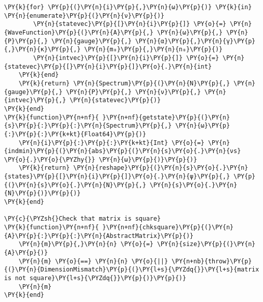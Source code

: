 \begin{Verbatim}[commandchars=\\\{\}]
    \PY{k}{for} \PY{p}{(}\PY{n}{i}\PY{p}{,}\PY{n}{ω}\PY{p}{)} \PY{k}{in} \PY{n}{enumerate}\PY{p}{(}\PY{n}{ν}\PY{p}{)}
        \PY{n}{statevec}\PY{p}{[}\PY{n}{i}\PY{p}{]} \PY{o}{=} \PY{n}{WaveFunction}\PY{p}{(}\PY{n}{A}\PY{p}{,} \PY{n}{ω}\PY{p}{,} \PY{n}{P}\PY{p}{,} \PY{n}{gauge}\PY{p}{,} \PY{n}{α}\PY{p}{,}\PY{n}{γ}\PY{p}{,}\PY{n}{κ}\PY{p}{,} \PY{n}{m₀}\PY{p}{,}\PY{n}{n₀}\PY{p}{)}
        \PY{n}{intvec}\PY{p}{[}\PY{n}{i}\PY{p}{]} \PY{o}{=} \PY{n}{statevec}\PY{p}{[}\PY{n}{i}\PY{p}{]}\PY{o}{.}\PY{n}{int}
    \PY{k}{end}
    \PY{k}{return} \PY{n}{Spectrum}\PY{p}{(}\PY{n}{N}\PY{p}{,} \PY{n}{gauge}\PY{p}{,} \PY{n}{P}\PY{p}{,} \PY{n}{ν}\PY{p}{,} \PY{n}{intvec}\PY{p}{,} \PY{n}{statevec}\PY{p}{)}
\PY{k}{end}
\PY{k}{function}\PY{n+nf}{ }\PY{n+nf}{getstate}\PY{p}{(}\PY{n}{s}\PY{p}{:}\PY{p}{:}\PY{n}{Spectrum}\PY{p}{,} \PY{n}{ω}\PY{p}{:}\PY{p}{:}\PY{k+kt}{Float64}\PY{p}{)}
    \PY{n}{i}\PY{p}{:}\PY{p}{:}\PY{k+kt}{Int} \PY{o}{=} \PY{n}{indmin}\PY{p}{(}\PY{n}{abs}\PY{p}{(}\PY{n}{s}\PY{o}{.}\PY{n}{νs} \PY{o}{.}\PY{o}{\PYZhy{}} \PY{n}{ω}\PY{p}{)}\PY{p}{)}
    \PY{k}{return} \PY{n}{reshape}\PY{p}{(}\PY{n}{s}\PY{o}{.}\PY{n}{states}\PY{p}{[}\PY{n}{i}\PY{p}{]}\PY{o}{.}\PY{n}{ψ}\PY{p}{,} \PY{p}{(}\PY{n}{s}\PY{o}{.}\PY{n}{N}\PY{p}{,} \PY{n}{s}\PY{o}{.}\PY{n}{N}\PY{p}{)}\PY{p}{)}
\PY{k}{end}

\PY{c}{\PYZsh{}Check that matrix is square}
\PY{k}{function}\PY{n+nf}{ }\PY{n+nf}{chksquare}\PY{p}{(}\PY{n}{A}\PY{p}{:}\PY{p}{:}\PY{n}{AbstractMatrix}\PY{p}{)}
    \PY{n}{m}\PY{p}{,}\PY{n}{n} \PY{o}{=} \PY{n}{size}\PY{p}{(}\PY{n}{A}\PY{p}{)}
    \PY{n}{m} \PY{o}{==} \PY{n}{n} \PY{o}{||} \PY{n+nb}{throw}\PY{p}{(}\PY{n}{DimensionMismatch}\PY{p}{(}\PY{l+s}{\PYZdq{}}\PY{l+s}{matrix is not square}\PY{l+s}{\PYZdq{}}\PY{p}{)}\PY{p}{)}
    \PY{n}{m}
\PY{k}{end}


\end{Verbatim}
